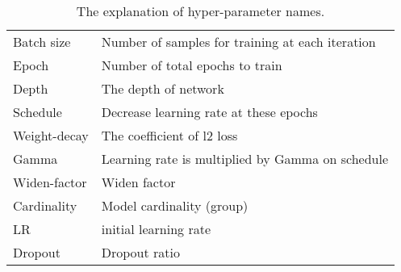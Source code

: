 \documentclass[11pt]{article}
\begin{document}
\begin{table}[htbp]
		\small
		\centering
		\begin{tabular}{|l|l|}
			\toprule
			Batch size & Number of samples for training at each iteration \\
			Epoch & Number of total epochs to train \\
			Depth & The depth of network \\
			Schedule & Decrease learning rate at these epochs \\
			Weight-decay    & The coefficient of l2 loss \\
			Gamma & Learning rate is multiplied by Gamma on schedule \\
			Widen-factor & Widen factor \\
			Cardinality & Model cardinality (group) \\
			LR    & initial learning rate \\
			Dropout  & Dropout ratio \\
			\bottomrule
		\end{tabular}\caption{The explanation of hyper-parameter names.}
        \label{tab:explain}\vspace{-0.2cm}
	\end{table}
\end{document}
